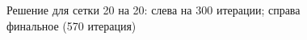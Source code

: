 \documentclass[12pt]{article}
\begin{document}
\begin{figure}[htb!]
\begin{minipage}[h]{0.49\linewidth}
\end{minipage}
\hfill
\begin{minipage}[h]{0.49\linewidth}
\end{minipage}
\caption{Решение для сетки 20 на 20: слева на 300 итерации; справа финальное (570 итерация)}
\end{figure}
\end{document}
